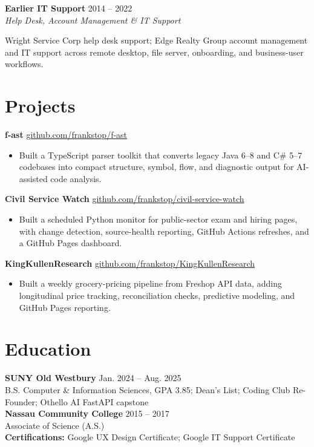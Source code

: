 \documentclass[10pt,letterpaper]{article}
\newcommand{\resumeCompactRole}[3]{
  \textbf{#1} \hfill #2\\
  \textit{#3}
}
\begin{document}
\resumeCompactRole{Earlier IT Support}{2014 -- 2022}{Help Desk, Account Management \& IT Support}
Wright Service Corp help desk support; Edge Realty Group account management and IT support across remote desktop, file server, onboarding, and business-user workflows.

\section*{Projects}
\textbf{f-ast} \hfill \href{https://github.com/frankstop/f-ast}{github.com/frankstop/f-ast}
\begin{itemize}
  \item Built a TypeScript parser toolkit that converts legacy Java 6--8 and C\# 5--7 codebases into compact structure, symbol, flow, and diagnostic output for AI-assisted code analysis.
\end{itemize}

\textbf{Civil Service Watch} \hfill \href{https://github.com/frankstop/civil-service-watch}{github.com/frankstop/civil-service-watch}
\begin{itemize}
  \item Built a scheduled Python monitor for public-sector exam and hiring pages, with change detection, source-health reporting, GitHub Actions refreshes, and a GitHub Pages dashboard.
\end{itemize}

\textbf{KingKullenResearch} \hfill \href{https://github.com/frankstop/KingKullenResearch}{github.com/frankstop/KingKullenResearch}
\begin{itemize}
  \item Built a weekly grocery-pricing pipeline from Freshop API data, adding longitudinal price tracking, reconciliation checks, predictive modeling, and GitHub Pages reporting.
\end{itemize}

\section*{Education}
\textbf{SUNY Old Westbury} \hfill Jan. 2024 -- Aug. 2025\\
B.S. Computer \& Information Sciences, GPA 3.85; Dean's List; Coding Club Re-Founder; Othello AI FastAPI capstone\\
\textbf{Nassau Community College} \hfill 2015 -- 2017\\
Associate of Science (A.S.)\\
\textbf{Certifications:} Google UX Design Certificate; Google IT Support Certificate
\end{document}
